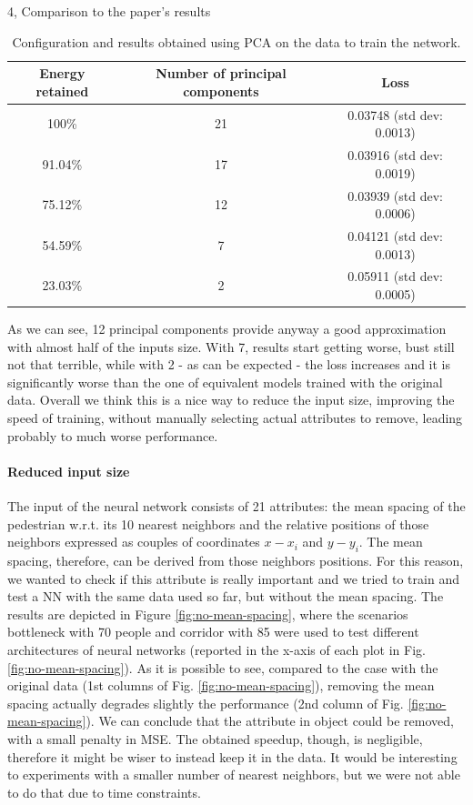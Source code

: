 \documentclass[10pt,a4paper]{article}
\begin{document}
\begin{task}{4, Comparison to the paper's results}
\begin{table}[h]
    \centering
    \begin{tabular}{|c|c|c|}
        \hline
        \textbf{Energy retained} & \textbf{Number of principal components} & \textbf{Loss}\\
        \hline
        100\% & 21 & 0.03748 (std dev: 0.0013)\\
        91.04\% & 17 &  0.03916 (std dev: 0.0019)\\
        75.12\% & 12 &  0.03939 (std dev: 0.0006)\\
        54.59\% & 7 &  0.04121 (std dev: 0.0013)\\
        23.03\% & 2 &  0.05911 (std dev: 0.0005)\\
        \hline
    \end{tabular}
    \caption{Configuration and results obtained using PCA on the data to train the network.}
    \label{tab:pca}
\end{table}

As we can see, 12 principal components provide anyway a good approximation with almost half of the inputs size.
With 7, results start getting worse, bust still not that terrible, while with 2 - as can be expected - the loss increases and it is significantly worse than the one of equivalent models trained with the original data.
Overall we think this is a nice way to reduce the input size, improving the speed of training, without manually selecting actual attributes to remove, leading probably to much worse performance.

\paragraph{Reduced input size}
The input of the neural network consists of 21 attributes: the mean spacing of the pedestrian w.r.t. its 10 nearest neighbors and the relative positions of those neighbors expressed as couples of coordinates $x-x_i$ and $y-y_i$.
The mean spacing, therefore, can be derived from those neighbors positions.
For this reason, we wanted to check if this attribute is really important and we tried to train and test a NN with the same data used so far, but without the mean spacing.
The results are depicted in Figure \ref{fig:no-mean-spacing}, where the scenarios bottleneck with 70 people and corridor with 85 were used to test different architectures of neural networks (reported in the x-axis of each plot in Fig. \ref{fig:no-mean-spacing}).
As it is possible to see, compared to the case with the original data (1st columns of Fig. \ref{fig:no-mean-spacing}), removing the mean spacing actually degrades slightly the performance (2nd column of Fig. \ref{fig:no-mean-spacing}).
We can conclude that the attribute in object could be removed, with a small penalty in MSE.
The obtained speedup, though, is negligible, therefore it might be wiser to instead keep it in the data.
It would be interesting to experiments with a smaller number of nearest neighbors, but we were not able to do that due to time constraints.


\end{task}
\end{document}
